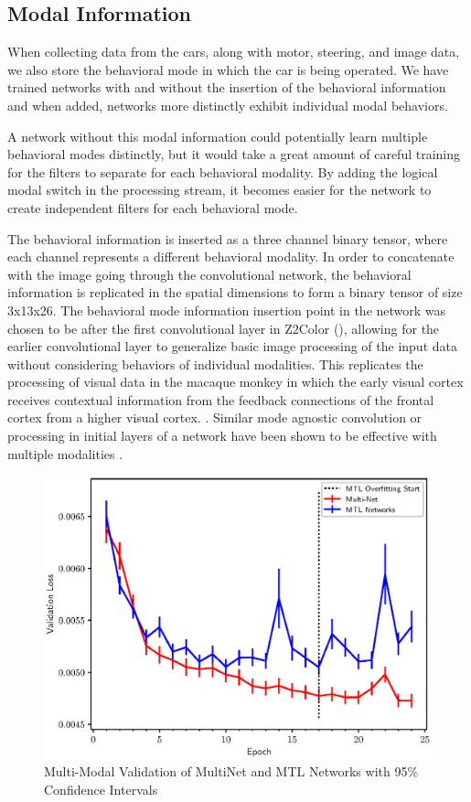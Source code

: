 \subsection{Modal Information}

When collecting data from the cars, along with motor, steering, and image data, we also store the behavioral mode in which the car is being operated. We have trained networks with and without the insertion of the behavioral information and when added, networks more distinctly exhibit individual modal behaviors.

A network without this modal information could potentially learn multiple behavioral modes distinctly, but it would take a great amount of careful training for the filters to separate for each behavioral modality. By adding the logical modal switch in the processing stream, it becomes easier for the network to create independent filters for each behavioral mode.

The behavioral information is inserted as a three channel binary tensor, where each channel represents a different behavioral modality. In order to concatenate with the image going through the convolutional network, the behavioral information is replicated in the spatial dimensions to form a binary tensor of size 3x13x26. The behavioral mode information insertion point in the network was chosen to be after the first convolutional layer in Z2Color (), allowing for the earlier convolutional layer to generalize basic image processing of the input data without considering behaviors of individual modalities. This replicates the processing of visual data in the macaque monkey in which the early visual cortex receives contextual information from the feedback connections of the frontal cortex from a higher visual cortex. \cite{zipser1996contextual}. Similar mode agnostic convolution or processing in initial layers of a network have been shown to be effective with multiple modalities \cite{firstlayernometa}.

\begin{figure}[t]
\centering
\includegraphics[width=\linewidth]{paper/content/images/mtl}
\caption{Multi-Modal Validation of MultiNet and MTL Networks with 95\% Confidence Intervals}
\label{fig:lve}
\end{figure}
